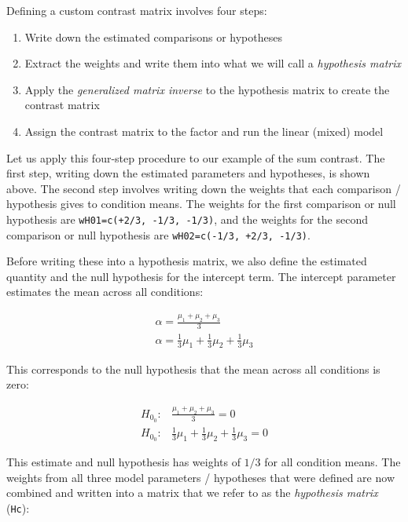 \documentclass[
  12pt,
]{krantz}
\providecommand{\tightlist}{%
  \setlength{\itemsep}{0pt}\setlength{\parskip}{0pt}}
\theoremstyle{definition}
\theoremstyle{definition}
\theoremstyle{definition}
\theoremstyle{definition}
\theoremstyle{remark}
\begin{document}
Defining a custom contrast matrix involves four steps:

\begin{enumerate}
\def\labelenumi{\arabic{enumi}.}
\tightlist
\item
  Write down the estimated comparisons or hypotheses
\item
  Extract the weights and write them into what we will call a \emph{hypothesis matrix}
\item
  Apply the \emph{generalized matrix inverse} to the hypothesis matrix to create the contrast matrix
\item
  Assign the contrast matrix to the factor and run the linear (mixed) model
\end{enumerate}

Let us apply this four-step procedure to our example of the sum contrast. The first step, writing down the estimated parameters and hypotheses, is shown above. The second step involves writing down the weights that each comparison / hypothesis gives to condition means. The weights for the first comparison or null hypothesis are \texttt{wH01=c(+2/3,\ -1/3,\ -1/3)}, and the weights for the second comparison or null hypothesis are \texttt{wH02=c(-1/3,\ +2/3,\ -1/3)}.

Before writing these into a hypothesis matrix, we also define the estimated quantity and the null hypothesis for the intercept term. The intercept parameter estimates the mean across all conditions:

\begin{align}
\alpha = \frac{\mu_1 + \mu_2 + \mu_3}{3} \\
\alpha = \frac{1}{3} \mu_1 + \frac{1}{3}\mu_2 + \frac{1}{3}\mu_3
\end{align}

This corresponds to the null hypothesis that the mean across all conditions is zero:

\begin{align}
H_{0_0}: &\frac{\mu_1 + \mu_2 + \mu_3}{3} = 0 \\
H_{0_0}: &\frac{1}{3} \mu_1 + \frac{1}{3}\mu_2 + \frac{1}{3}\mu_3 = 0
\end{align}

This estimate and null hypothesis has weights of \(1/3\) for all condition means.
The weights from all three model parameters / hypotheses that were defined are now combined and written into a matrix that we refer to as the \emph{hypothesis matrix} (\texttt{Hc}):
\end{document}
